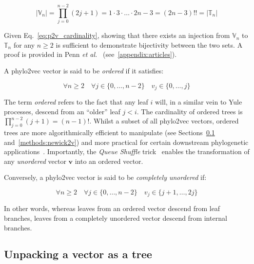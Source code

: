 \begin{equation}
    |\mathbb{V}_n| = \prod_{j=0}^{n-2}(2j+1) = 1\cdot3\cdot\ldots\cdot2n-3=(2n-3)!! = |\mathbb{T}_n|
    \label{eq:p2v_cardinality}
\end{equation}

Given Eq.~\ref{eq:p2v_cardinality}, showing that there exists an injection from $\mathbb{V}_n$ to $\mathbb{T}_n$ for any $n \geq 2$ is sufficient to demonstrate bijectivity between the two sets. A proof is provided in Penn \textit{et al.}~\cite{penn2025} (see~\ref{appendix:articles}).

A phylo2vec vector is said to be \textit{ordered} if it satisfies:

\begin{equation}
    \forall n \geq 2 \quad \forall j \in \{0, \ldots, n-2\} \quad v_j \in \{0, \ldots, j\}  
    \label{eq:p2v_ordered}
\end{equation}

The term \textit{ordered} refers to the fact that any leaf $i$ will, in a similar vein to Yule processes, descend from an “older” leaf $j < i$. The cardinality of ordered trees is $\prod_{j=0}^{n-2}(j+1) = (n-1)!$. Whilst a subset of all phylo2vec vectors, ordered trees are more algorithmically efficient to manipulate (see Sections~\ref{methods:v2newick} and~\ref{methods:newick2v}) and more practical for certain downstream phylogenetic applications~\cite{penn2023, penn2025}. Importantly, the \emph{Queue Shuffle} trick~\cite{penn2023} enables the transformation of any \emph{unordered} vector $\boldsymbol{v}$ into an ordered vector.

Conversely, a phylo2vec vector is said to be \textit{completely unordered} if:

\begin{equation}
    \forall n \geq 2 \quad \forall j \in \{0, \ldots, n-2\} \quad v_j \in \{j+1, \ldots, 2j\}  
    \label{eq:p2v_completelyunordered}
\end{equation}

In other words, whereas leaves from an ordered vector descend from leaf branches, leaves from a completely unordered vector descend from internal branches.

\subsection{Unpacking a vector as a tree}
\label{methods:v2newick}

